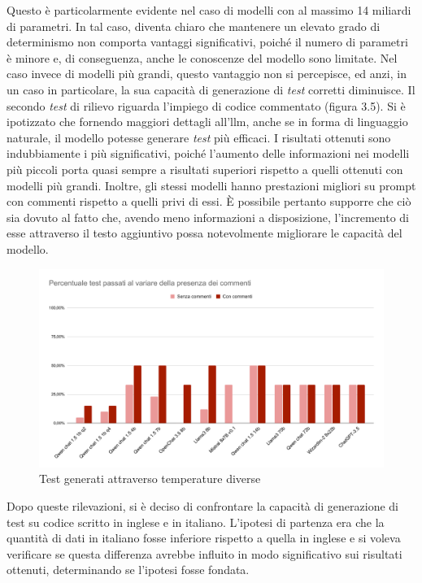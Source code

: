     Questo è particolarmente evidente nel caso di modelli con al massimo 14 miliardi di parametri. 
    In tal caso, diventa chiaro che mantenere un elevato grado di determinismo non comporta vantaggi significativi, 
    poiché il numero di parametri è minore e, di conseguenza, anche le conoscenze del modello sono limitate. Nel caso invece 
    di modelli più grandi, questo vantaggio non si percepisce, ed anzi, in un caso in particolare, la sua capacità di generazione di \textit{test} corretti diminuisce.
    Il secondo \textit{test} di rilievo riguarda l'impiego di codice commentato (figura 3.5). Si è ipotizzato che fornendo maggiori dettagli all'\gls{llm}, 
    anche se in forma di linguaggio naturale, il modello potesse generare \textit{test} più efficaci. I risultati ottenuti sono indubbiamente 
    i più significativi, poiché l'aumento delle informazioni nei modelli più piccoli porta quasi sempre a risultati superiori rispetto 
    a quelli ottenuti con modelli più grandi. Inoltre, gli stessi modelli hanno prestazioni migliori su prompt con commenti rispetto a
     quelli privi di essi. È possibile pertanto supporre che ciò sia dovuto al fatto che, avendo meno informazioni a disposizione, l'incremento di esse 
     attraverso il testo aggiuntivo possa notevolmente migliorare le capacità del modello.
    \begin{figure}[htp]
        \centering        
        \includegraphics[width=14.5cm]{img/Percentuale test passati al variare della presenza dei commenti.pdf}
        \caption{Test generati attraverso temperature diverse}
    \end{figure}\newpage   
 Dopo queste rilevazioni, si è deciso di confrontare la capacità di generazione di test su codice scritto in inglese e in italiano. L'ipotesi di partenza era che la quantità di dati in italiano fosse inferiore rispetto a quella in inglese e si voleva verificare se questa differenza avrebbe influito in modo significativo sui risultati ottenuti, determinando se l'ipotesi fosse fondata.
